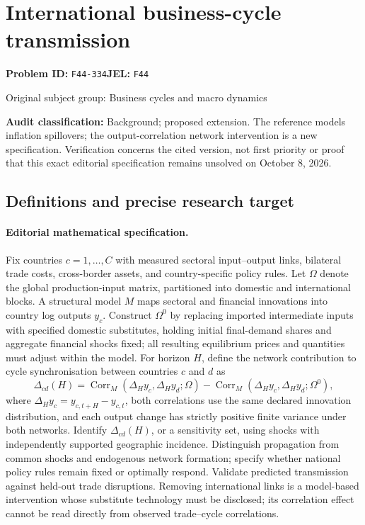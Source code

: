 \documentclass[11pt,a4paper]{article}
\begin{document}
\section*{International business-cycle transmission}
\textbf{Problem ID:} \texttt{F44-334}\quad \textbf{JEL:} \texttt{F44}\par
\label{problem:OP-0238}
\label{audited:ECON-083}
{\sffamily\small\color{muted}Original subject group: Business cycles and macro dynamics\par}
\label{definitions:problem:30007519}
\textbf{Audit classification:} Background; proposed extension. The reference models inflation spillovers; the output-correlation network intervention is a new specification. Verification concerns the cited version, not first priority or proof that this exact editorial specification remains unsolved on October 8, 2026.
\subsection*{Definitions and precise research target}
\paragraph{Editorial mathematical specification.} Fix countries \(c=1,\ldots,C\) with measured sectoral input–output links, bilateral trade costs, cross-border assets, and country-specific policy rules. Let \(\Omega\) denote the global production-input matrix, partitioned into domestic and international blocks. A structural model \(M\) maps sectoral and financial innovations into country log outputs \(y_c\). Construct \(\Omega^0\) by replacing imported intermediate inputs with specified domestic substitutes, holding initial final-demand shares and aggregate financial shocks fixed; all resulting equilibrium prices and quantities must adjust within the model.
For horizon \(H\), define the network contribution to cycle synchronisation between countries \(c\) and \(d\) as
\[
\Delta_{cd}(H)=\operatorname{Corr}_M(\Delta_H y_c,\Delta_H y_d;\Omega)
-\operatorname{Corr}_M(\Delta_H y_c,\Delta_H y_d;\Omega^0),
\]
where \(\Delta_H y_c=y_{c,t+H}-y_{c,t}\), both correlations use the same declared innovation distribution, and each output change has strictly positive finite variance under both networks. Identify \(\Delta_{cd}(H)\), or a sensitivity set, using shocks with independently supported geographic incidence. Distinguish propagation from common shocks and endogenous network formation; specify whether national policy rules remain fixed or optimally respond. Validate predicted transmission against held-out trade disruptions. Removing international links is a model-based intervention whose substitute technology must be disclosed; its correlation effect cannot be read directly from observed trade–cycle correlations.
\end{document}
